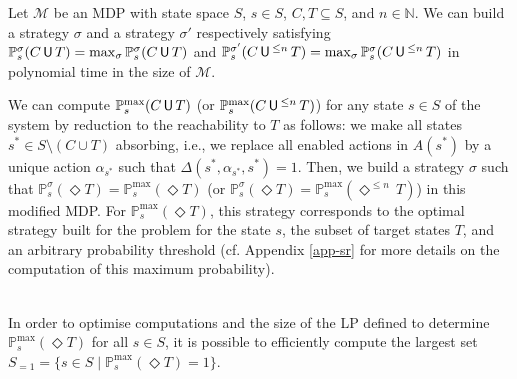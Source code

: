 \begin{theorem} \label{cut-strategy}
  Let $\mathcal{M}$ be an MDP with state space $S$, $s \in S$, $C, T \subseteq S$, and $n \in \mathbb{N}$.
  We can build a strategy $\sigma$ and a strategy $\sigma'$ respectively satisfying $\mathbb{P}_s^\sigma (C \,\text{\sffamily U}\, T) = \max_{\sigma} \mathbb{P}_s^\sigma(C \,\text{\sffamily U}\, T)$ and
$\mathbb{P}_s^{\sigma'} (C \,\text{\sffamily U}\,^{\leq n}\, T) = \max_{\sigma} \mathbb{P}_s^\sigma(C \,\text{\sffamily U}\,^{\leq n}\, T)$
in polynomial time in the size of $\mathcal{M}$.
\end{theorem}
\begin{proof2}
We can compute $\mathbb{P}_s^{\max}(C \,\text{\sffamily U}\, T)$ (or $\mathbb{P}_s^{\max}(C \,\text{\sffamily U}\,^{\leq n} \, T)$) for any state $s \in S$ of the system by reduction to the reachability to $T$ as follows:
we make all states $s^* \in S \setminus (C \cup T)$ absorbing, i.e., we replace all enabled actions in $A(s^*)$
by a unique action $\alpha_{s^*}$ such that $\Delta(s^*, \alpha_{s^*}, s^*) = 1$.
Then, we build a strategy $\sigma$ such that $\mathbb{P}^{\sigma}_s(\Diamond T) = \mathbb{P}^{\max}_s(\Diamond T)$ (or $\mathbb{P}^{\sigma}_s(\Diamond T) = \mathbb{P}^{\max}_s(\Diamond^{\leq n}\, T)$) in this modified MDP.
For $\mathbb{P}_s^{\max}(\Diamond T)$, this strategy corresponds to the optimal strategy built for the \SR{} problem for the state $s$, the subset of target states $T$, and an arbitrary probability threshold (cf. Appendix \ref{app-sr} for more details on the computation of this maximum probability).

\end{proof2}
$ $\\

In order to optimise computations and the size of the LP defined to determine
$\mathbb{P}_s^{\max}(\Diamond T)$ for all $s \in S$,
it is possible to efficiently compute the largest set $S_{=1} = \{s \in S \; | \; \mathbb{P}_s^{\max}(\Diamond T) = 1 \}$.


